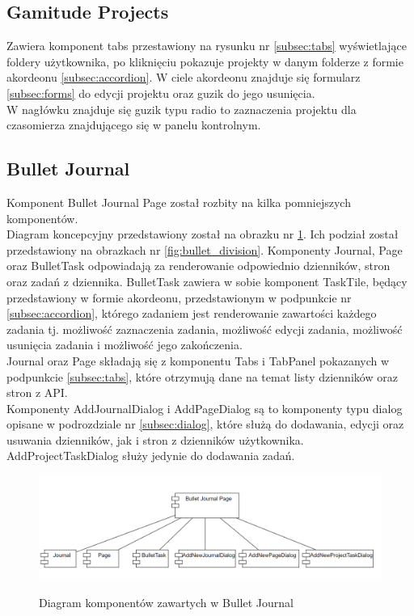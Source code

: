 \documentclass[a4paper,11pt]{report}
\begin{document}
\subsection{Gamitude Projects}
Zawiera komponent tabs przestawiony na rysunku nr \ref{subsec:tabs} wyświetlające foldery użytkownika, po kliknięciu pokazuje projekty w danym folderze z formie akordeonu \ref{subsec:accordion}.
W ciele akordeonu znajduje się formularz \ref{subsec:forms} do edycji projektu oraz guzik do jego usunięcia.\\
W nagłówku znajduje się guzik typu radio to zaznaczenia projektu dla czasomierza znajdującego się w panelu kontrolnym.

\subsection{Bullet Journal}
Komponent Bullet Journal Page został rozbity na kilka pomniejszych komponentów.\\
 Diagram koncepcyjny przedstawiony został na obrazku nr \ref{fig:bullet_diagram}.
 Ich podział został przedstawiony na obrazkach nr \ref{fig:bullet_division}.
 Komponenty Journal, Page oraz BulletTask odpowiadają za renderowanie odpowiednio dzienników, stron oraz zadań z dziennika.
 BulletTask zawiera w sobie komponent TaskTile, będący przedstawiony w formie akordeonu, przedstawionym w podpunkcie nr \ref{subsec:accordion},
 którego zadaniem jest renderowanie zawartości każdego zadania tj. możliwość zaznaczenia zadania, możliwość edycji zadania, możliwość usunięcia zadania i możliwość jego zakończenia.\\
 Journal oraz Page składają się z komponentu Tabs i TabPanel pokazanych w podpunkcie \ref{subsec:tabs}, które otrzymują dane na temat listy dzienników oraz stron z API.\\
 Komponenty AddJournalDialog i AddPageDialog są to komponenty typu dialog opisane w podrozdziale nr \ref{subsec:dialog},
 które służą do dodawania, edycji oraz usuwania dzienników, jak i stron z dzienników użytkownika.
 AddProjectTaskDialog służy jedynie do dodawania zadań.\\
\begin{figure}[H]
	\centering
	\includegraphics[scale=0.5]{implementacja/frontend/bullet_journal_diagram}\\
	\caption{Diagram komponentów zawartych w Bullet Journal}
	\label{fig:bullet_diagram}
\end{figure}
\end{document}
